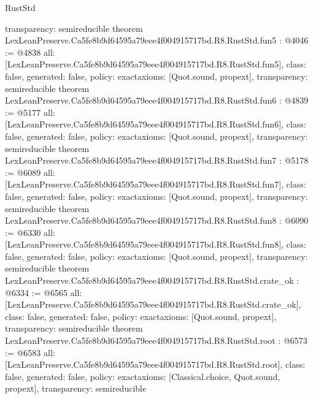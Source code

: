 \begin{lexlean}{RustStd}
\begin{coremodule}
{  transparency: semireducible
}
theorem LexLeanPreserve.Ca5fe8b9d64595a79eee4f004915717bd.R8.RustStd.fun5 : @4046 := @4838 {
  all: [LexLeanPreserve.Ca5fe8b9d64595a79eee4f004915717bd.R8.RustStd.fun5],
  class: false,
  generated: false,
  policy: exact{axioms: [Quot.sound, propext]},
  transparency: semireducible
}
theorem LexLeanPreserve.Ca5fe8b9d64595a79eee4f004915717bd.R8.RustStd.fun6 : @4839 := @5177 {
  all: [LexLeanPreserve.Ca5fe8b9d64595a79eee4f004915717bd.R8.RustStd.fun6],
  class: false,
  generated: false,
  policy: exact{axioms: [Quot.sound, propext]},
  transparency: semireducible
}
theorem LexLeanPreserve.Ca5fe8b9d64595a79eee4f004915717bd.R8.RustStd.fun7 : @5178 := @6089 {
  all: [LexLeanPreserve.Ca5fe8b9d64595a79eee4f004915717bd.R8.RustStd.fun7],
  class: false,
  generated: false,
  policy: exact{axioms: [Quot.sound, propext]},
  transparency: semireducible
}
theorem LexLeanPreserve.Ca5fe8b9d64595a79eee4f004915717bd.R8.RustStd.fun8 : @6090 := @6330 {
  all: [LexLeanPreserve.Ca5fe8b9d64595a79eee4f004915717bd.R8.RustStd.fun8],
  class: false,
  generated: false,
  policy: exact{axioms: [Quot.sound, propext]},
  transparency: semireducible
}
theorem LexLeanPreserve.Ca5fe8b9d64595a79eee4f004915717bd.R8.RustStd.crate_ok : @6334 := @6565 {
  all: [LexLeanPreserve.Ca5fe8b9d64595a79eee4f004915717bd.R8.RustStd.crate_ok],
  class: false,
  generated: false,
  policy: exact{axioms: [Quot.sound, propext]},
  transparency: semireducible
}
theorem LexLeanPreserve.Ca5fe8b9d64595a79eee4f004915717bd.R8.RustStd.root : @6573 := @6583 {
  all: [LexLeanPreserve.Ca5fe8b9d64595a79eee4f004915717bd.R8.RustStd.root],
  class: false,
  generated: false,
  policy: exact{axioms: [Classical.choice, Quot.sound, propext]},
  transparency: semireducible
}


\end{coremodule}
\end{lexlean}
